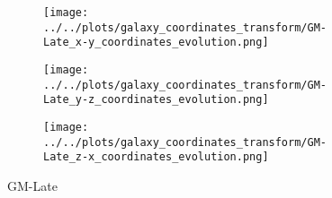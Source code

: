 \documentclass{article}
\begin{document}
	\begin{figure}
		\centering
		\begin{subfigure} {.325\columnwidth}
				\centering 
				\texttt{[image: ../../plots/galaxy\_coordinates\_transform/GM-Late\_x-y\_coordinates\_evolution.png]}
		\end{subfigure}
			\hfill
		\begin{subfigure} {.325\columnwidth}
				\centering 
				\texttt{[image: ../../plots/galaxy\_coordinates\_transform/GM-Late\_y-z\_coordinates\_evolution.png]}
		\end{subfigure}
			\hfill
		\begin{subfigure} {.325\columnwidth}
				\centering 
				\texttt{[image: ../../plots/galaxy\_coordinates\_transform/GM-Late\_z-x\_coordinates\_evolution.png]}
		\end{subfigure}
		
		\caption{GM-Late}
	\end{figure}
\end{document}
